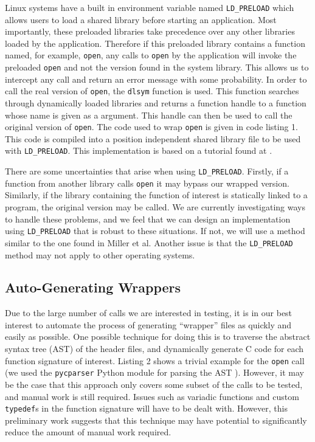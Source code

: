 \documentclass[10pt]{article}
\begin{document}
Linux systems have a built in environment variable named \texttt{LD\_PRELOAD} which allows users to load a shared library before starting an application. Most importantly, these preloaded libraries take precedence over any other libraries loaded by the application. Therefore if this preloaded library contains a function named, for example, \texttt{open}, any calls to \texttt{open} by the application will invoke the preloaded \texttt{open} and not the version found in the system library. This allows us to intercept any call and return an error message with some probability. In order to call the real version of \texttt{open}, the \texttt{dlsym} function is used. This function searches through dynamically loaded libraries and returns a function handle to a function whose name is given as a argument. This handle can then be used to call the original version of \texttt{open}. The code used to wrap \texttt{open} is given in code listing 1. This code is compiled into a position independent shared library file to be used with \texttt{LD\_PRELOAD}. This implementation is based on a tutorial found at \cite{preload}.

There are some uncertainties that arise when using \texttt{LD\_PRELOAD}. Firstly, if a function from another library calls \texttt{open} it may bypass our wrapped version. Similarly, if the library containing the function of interest is statically linked to a program, the original version may be called. We are currently investigating ways to handle these problems, and we feel that we can design an implementation using \texttt{LD\_PRELOAD} that is robust to these situations. If not, we will use a method similar to the one found in Miller et al. Another issue is that the \texttt{LD\_PRELOAD} method may not apply to other operating systems.

\subsection{Auto-Generating Wrappers}
Due to the large number of calls we are interested in testing, it is in our best interest to automate the process of generating ``wrapper'' files as quickly and easily as possible. One possible technique for doing this is to traverse the abstract syntax tree (AST) of the header files, and dynamically generate C code for each function signature of interest. Listing 2 shows a trivial example for the \texttt{open} call (we used the \texttt{pycparser} Python module for parsing the AST \cite{pycparser}). However, it may be the case that this approach only covers some subset of the calls to be tested, and manual work is still required. Issues such as variadic functions and custom \texttt{typedef}s in the function signature will have to be dealt with. However, this preliminary work suggests that this technique may have potential to significantly reduce the amount of manual work required.
\end{document}
